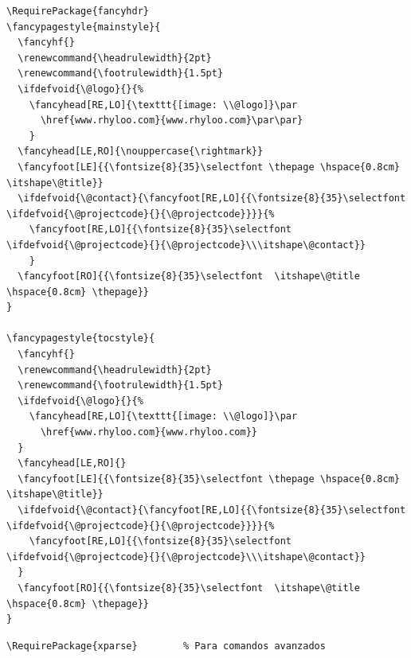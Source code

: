 \documentclass{reporti}
\begin{document}
\begin{verbatim}
\RequirePackage{fancyhdr}      
\fancypagestyle{mainstyle}{
  \fancyhf{}
  \renewcommand{\headrulewidth}{2pt}
  \renewcommand{\footrulewidth}{1.5pt}
  \ifdefvoid{\@logo}{}{%
    \fancyhead[RE,LO]{\texttt{[image: \\@logo]}\par
      \href{www.rhyloo.com}{www.rhyloo.com}\par\par}
    }
  \fancyhead[LE,RO]{\nouppercase{\rightmark}}
  \fancyfoot[LE]{{\fontsize{8}{35}\selectfont \thepage \hspace{0.8cm} \itshape\@title}}
  \ifdefvoid{\@contact}{\fancyfoot[RE,LO]{{\fontsize{8}{35}\selectfont \ifdefvoid{\@projectcode}{}{\@projectcode}}}}{%
    \fancyfoot[RE,LO]{{\fontsize{8}{35}\selectfont \ifdefvoid{\@projectcode}{}{\@projectcode}\\\itshape\@contact}}
    }
  \fancyfoot[RO]{{\fontsize{8}{35}\selectfont  \itshape\@title \hspace{0.8cm} \thepage}}
}

\fancypagestyle{tocstyle}{
  \fancyhf{}
  \renewcommand{\headrulewidth}{2pt}
  \renewcommand{\footrulewidth}{1.5pt}
  \ifdefvoid{\@logo}{}{%
    \fancyhead[RE,LO]{\texttt{[image: \\@logo]}\par
      \href{www.rhyloo.com}{www.rhyloo.com}}
  }
  \fancyhead[LE,RO]{}
  \fancyfoot[LE]{{\fontsize{8}{35}\selectfont \thepage \hspace{0.8cm} \itshape\@title}}
  \ifdefvoid{\@contact}{\fancyfoot[RE,LO]{{\fontsize{8}{35}\selectfont \ifdefvoid{\@projectcode}{}{\@projectcode}}}}{%
    \fancyfoot[RE,LO]{{\fontsize{8}{35}\selectfont \ifdefvoid{\@projectcode}{}{\@projectcode}\\\itshape\@contact}}
  }
  \fancyfoot[RO]{{\fontsize{8}{35}\selectfont  \itshape\@title \hspace{0.8cm} \thepage}}
}

\end{verbatim}

\begin{verbatim}
\RequirePackage{xparse}        % Para comandos avanzados
\end{verbatim}
\end{document}
